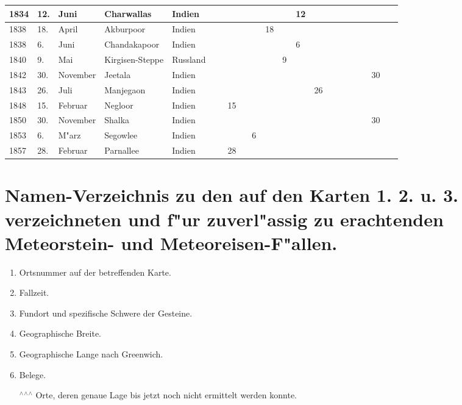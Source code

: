\documentclass[a4paper, 8pt, oneside, polutonikogreek, german]{article}
\begin{document}
\begin{landscape}
\begin{table}[H]
\begin{longtable}{|l|l|l|l|l|l|l|l|l|l|l|l|l|l|l|l|l|}
        1834 & 12. & Juni & Charwallas & Indien & ~ & ~ & ~ & ~ & ~ & 12 & ~ & ~ & ~ & ~ & ~ & ~ \\ \hline
        1838 & 18. & April & Akburpoor & Indien & ~ & ~ & ~ & 18 & ~ & ~ & ~ & ~ & ~ & ~ & ~ & ~ \\ \hline
        1838 & 6. & Juni & Chandakapoor & Indien & ~ & ~ & ~ & ~ & ~ & 6 & ~ & ~ & ~ & ~ & ~ & ~ \\ \hline
        1840 & 9. & Mai & Kirgisen-Steppe & Russland & ~ & ~ & ~ & ~ & 9 & ~ & ~ & ~ & ~ & ~ & ~ & ~ \\ \hline
        1842 & 30. & November & Jeetala & Indien & ~ & ~ & ~ & ~ & ~ & ~ & ~ & ~ & ~ & ~ & 30 & ~ \\ \hline
        1843 & 26. & Juli & Manjegaon & Indien & ~ & ~ & ~ & ~ & ~ & ~ & 26 & ~ & ~ & ~ & ~ & ~ \\ \hline
        1848 & 15. & Februar & Negloor & Indien & ~ & 15 & ~ & ~ & ~ & ~ & ~ & ~ & ~ & ~ & ~ & ~ \\ \hline
        1850 & 30. & November & Shalka & Indien & ~ & ~ & ~ & ~ & ~ & ~ & ~ & ~ & ~ & ~ & 30 & ~ \\ \hline
        1853 & 6. & M"arz & Segowlee & Indien & ~ & ~ & 6 & ~ & ~ & ~ & ~ & ~ & ~ & ~ & ~ & ~ \\ \hline
        1857 & 28. & Februar & Parnallee & Indien & ~ & 28 ~ & ~ & ~ & ~ & ~ & ~ & ~ & ~ & ~ & ~ & ~ \\ \hline
    \end{longtable}
\end{table}
\end{landscape}
\clearpage
\section{Namen-Verzeichnis zu den auf den Karten 1. 2. u. 3. verzeichneten und f"ur zuverl"assig zu erachtenden Meteorstein- und Meteoreisen-F"allen.}
\begin{enumerate}
    \item Ortsnummer auf der betreffenden Karte.
    \item Fallzeit.
    \item Fundort und spezifische Schwere der Gesteine.
    \item Geographische Breite.
    \item Geographische Lange nach Greenwich.
    \item Belege.
    \item[$^\wedge$$^\wedge$$^\wedge$] Orte, deren genaue Lage bis jetzt noch nicht ermittelt werden konnte.
\end{enumerate}
\clearpage
\end{document}
